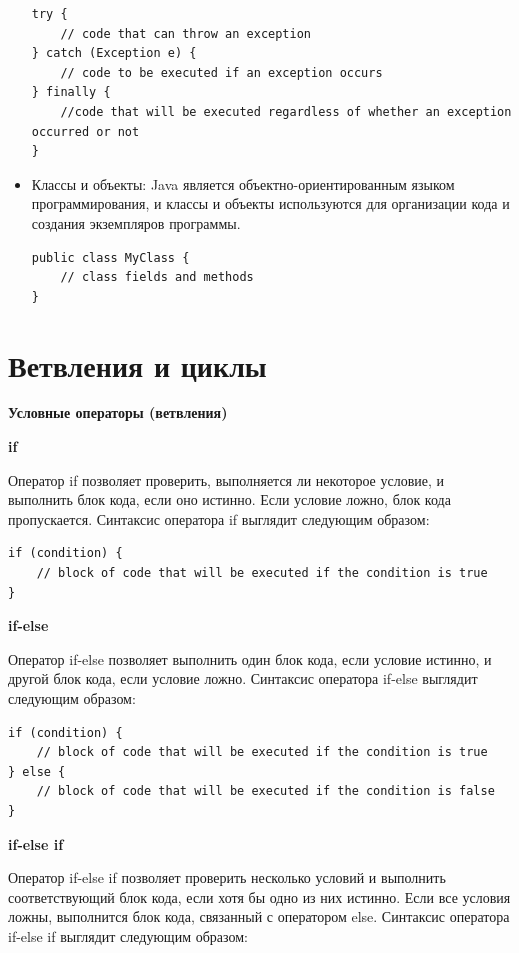 \begin{itemize}
\begin{lstlisting}
try {
    // code that can throw an exception
} catch (Exception e) {
    // code to be executed if an exception occurs
} finally {
    //code that will be executed regardless of whether an exception occurred or not
}
\end{lstlisting}

\item Классы и объекты: Java является объектно-ориентированным языком программирования, и классы и объекты используются для организации кода и создания экземпляров программы.

\begin{lstlisting}
public class MyClass {
    // class fields and methods
}
\end{lstlisting}
\end{itemize}

\section{Ветвления и циклы}

\textbf{Условные операторы (ветвления)}

\textbf{if}

Оператор if позволяет проверить, выполняется ли некоторое условие, и выполнить блок кода, если оно истинно. Если условие ложно, блок кода пропускается. Синтаксис оператора if выглядит следующим образом:

\begin{lstlisting}
if (condition) {
    // block of code that will be executed if the condition is true
}
\end{lstlisting}

\textbf{if-else}

Оператор if-else позволяет выполнить один блок кода, если условие истинно, и другой блок кода, если условие ложно. Синтаксис оператора if-else выглядит следующим образом:

\begin{lstlisting}
if (condition) {
    // block of code that will be executed if the condition is true
} else {
    // block of code that will be executed if the condition is false
}
\end{lstlisting}

\textbf{if-else if}

Оператор if-else if позволяет проверить несколько условий и выполнить соответствующий блок кода, если хотя бы одно из них истинно. Если все условия ложны, выполнится блок кода, связанный с оператором else. Синтаксис оператора if-else if выглядит следующим образом:

